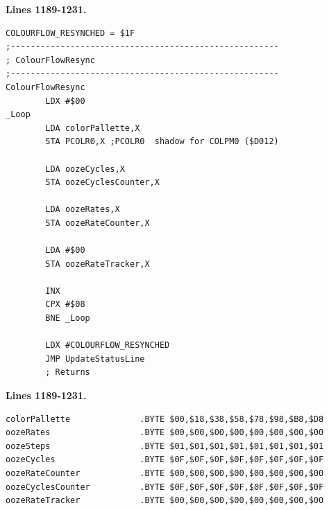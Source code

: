\textbf{Lines 1189-1231. } 
\begin{lstlisting}
COLOURFLOW_RESYNCHED = $1F
;------------------------------------------------------
; ColourFlowResync
;------------------------------------------------------
ColourFlowResync
        LDX #$00
_Loop   
        LDA colorPallette,X
        STA PCOLR0,X ;PCOLR0  shadow for COLPM0 ($D012)

        LDA oozeCycles,X
        STA oozeCyclesCounter,X

        LDA oozeRates,X
        STA oozeRateCounter,X

        LDA #$00
        STA oozeRateTracker,X

        INX 
        CPX #$08
        BNE _Loop

        LDX #COLOURFLOW_RESYNCHED
        JMP UpdateStatusLine
        ; Returns

\end{lstlisting}
\textbf{Lines 1189-1231. } 
\begin{lstlisting}
colorPallette              .BYTE $00,$18,$38,$58,$78,$98,$B8,$D8
oozeRates                  .BYTE $00,$00,$00,$00,$00,$00,$00,$00
oozeSteps                  .BYTE $01,$01,$01,$01,$01,$01,$01,$01
oozeCycles                 .BYTE $0F,$0F,$0F,$0F,$0F,$0F,$0F,$0F
oozeRateCounter            .BYTE $00,$00,$00,$00,$00,$00,$00,$00
oozeCyclesCounter          .BYTE $0F,$0F,$0F,$0F,$0F,$0F,$0F,$0F
oozeRateTracker            .BYTE $00,$00,$00,$00,$00,$00,$00,$00
\end{lstlisting}
\clearpage

